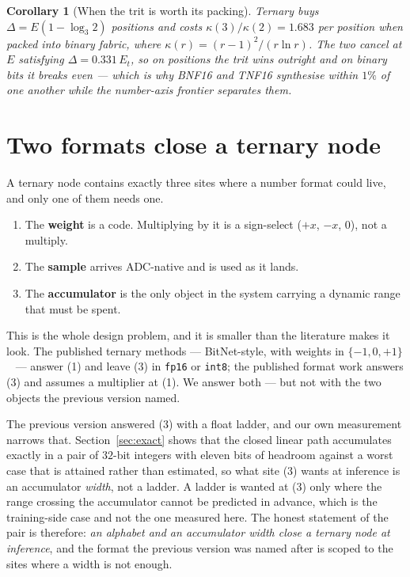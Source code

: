 \documentclass[11pt]{article}
\newtheorem{corollary}{Corollary}
\theoremstyle{definition}
\begin{document}
\begin{corollary}[When the trit is worth its packing]
\label{cor:worth}
Ternary buys $\Delta = E(1-\log_3 2)$ positions and costs
$\kappa(3)/\kappa(2) = 1.683$ per position when packed into binary fabric, where
$\kappa(r) = (r-1)^2/(r \ln r)$. The two cancel at $E$ satisfying
$\Delta = 0.331\,E_t$, so on positions the trit wins outright and on binary bits
it breaks even --- which is why BNF16 and TNF16 synthesise within $1\%$ of one
another while the number-axis frontier separates them.
\end{corollary}



\section{Two formats close a ternary node}
\label{sec:pair}

A ternary node contains exactly three sites where a number format could live, and
only one of them needs one.

\begin{enumerate}
\item The \textbf{weight} is a code. Multiplying by it is a sign-select
      ($+x$, $-x$, $0$), not a multiply.
\item The \textbf{sample} arrives ADC-native and is used as it lands.
\item The \textbf{accumulator} is the only object in the system carrying a
      dynamic range that must be spent.
\end{enumerate}

This is the whole design problem, and it is smaller than the literature makes it
look. The published ternary methods --- BitNet-style, with weights in
$\{-1,0,+1\}$~\cite{bitnet} --- answer (1) and leave (3) in \texttt{fp16} or
\texttt{int8}; the published format work answers (3) and assumes a multiplier at
(1). We answer both --- but not with the two objects the previous version named.

The previous version answered (3) with a float ladder, and our own measurement
narrows that. Section~\ref{sec:exact} shows that the closed linear path
accumulates exactly in a pair of $32$-bit integers with eleven bits of headroom
against a worst case that is attained rather than estimated, so what site (3)
wants at inference is an accumulator \emph{width}, not a ladder. A ladder is
wanted at (3) only where the range crossing the accumulator cannot be predicted
in advance, which is the training-side case and not the one measured here. The
honest statement of the pair is therefore: \emph{an alphabet and an accumulator
width close a ternary node at inference}, and the format the previous version was
named after is scoped to the sites where a width is not enough.
\end{document}
